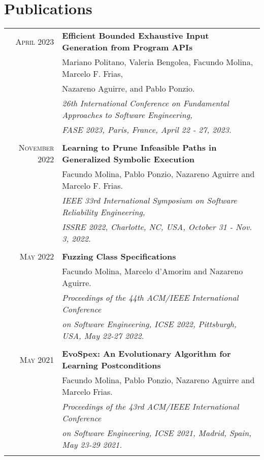 \documentclass[a4paper,10pt]{article} %
\begin{document}
\section{Publications}
\begin{longtable}{rl}

\textsc{April} 2023  & \textbf{Efficient Bounded Exhaustive Input Generation from Program APIs} \\
        & Mariano Politano, Valeria Bengolea, Facundo Molina, Marcelo F. Frias,\\
        & Nazareno Aguirre, and Pablo Ponzio. \\
	& \textit{26th International Conference on Fundamental Approaches to Software Engineering,} \\
        & \textit{FASE 2023, Paris, France, April 22 - 27, 2023.} \\ & \\

\textsc{November} 2022  & \textbf{Learning to Prune Infeasible Paths in Generalized Symbolic Execution} \\
        & Facundo Molina, Pablo Ponzio, Nazareno Aguirre and Marcelo F. Frias.\\
        & \textit{IEEE 33rd International Symposium on Software Reliability Engineering,} \\
        & \textit{ISSRE 2022, Charlotte, NC, USA, October 31 - Nov. 3, 2022.} \\ & \\

\textsc{May} 2022  & \textbf{Fuzzing Class Specifications} \\
	& Facundo Molina, Marcelo d'Amorim and Nazareno Aguirre. \\
	& \textit{Proceedings of the 44th ACM/IEEE International Conference} \\
	& \textit{on Software Engineering, ICSE 2022, Pittsburgh, USA, May 22-27 2022.} \\ & \\

\textsc{May} 2021  & \textbf{EvoSpex: An Evolutionary Algorithm for Learning Postconditions} \\
& Facundo Molina, Pablo Ponzio, Nazareno Aguirre and Marcelo Frias. \\
& \textit{Proceedings of the 43rd ACM/IEEE International Conference} \\
& \textit{on Software Engineering, ICSE 2021, Madrid, Spain, May 23-29 2021.} \\ & \\


\end{longtable}
\end{document}
